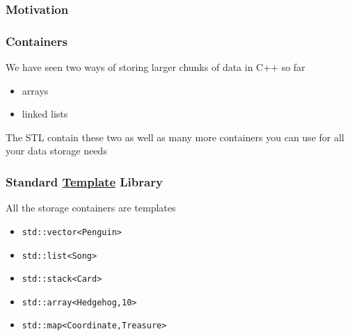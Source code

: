 \documentclass[14pt,a4paper,dvipsnames,usenames]{beamer}
\begin{document}
\begin{frame}[fragile]
  \frametitle{Motivation}

  \begin{center}
  \end{center}
\end{frame}

\begin{frame}[fragile]
  \frametitle{Containers}

  We have seen two ways of storing larger chunks of data in C++ so far

  \vspace{.5em}
  \begin{itemize}
    \setlength\itemsep{.3em}
    \item arrays 
    \item linked lists
  \end{itemize}

  \vspace{.5em}
  The STL contain these two as well as many more containers you can use for all your data storage needs
  
\end{frame}

\begin{frame}[fragile]
  \frametitle{Standard \underline{Template} Library}

  All the storage containers are templates

  \vspace{.5em}
  \begin{itemize}
    \setlength\itemsep{.5em}
    \item \lstinline[morekeywords={vector}]!std::vector<Penguin>!
    \item \lstinline[morekeywords={list}]!std::list<Song>!
    \item \lstinline[morekeywords={stack}]!std::stack<Card>!
    \item \lstinline[morekeywords={array}]!std::array<Hedgehog,10>!
    \item \lstinline[morekeywords={map,string}]!std::map<Coordinate,Treasure>!
  \end{itemize}
  
\end{frame}
\end{document}
